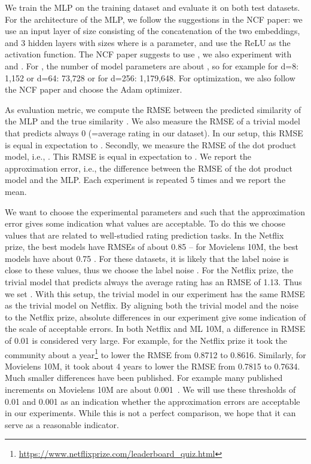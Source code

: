 \documentclass{article}
\begin{document}
We train the MLP on the training dataset and evaluate it on both test datasets. For the architecture of the MLP, we follow the suggestions in the NCF paper: we use an input layer of size  consisting of the concatenation of the two embeddings, and 3 hidden layers with sizes  where  is a parameter, and use the ReLU as the activation function.
The NCF paper suggests to use , we also experiment with  and .
For , the number of model parameters are about , so for example for d=8: 1,152 or d=64: 73,728 or for d=256: 1,179,648.
For optimization, we also follow the NCF paper and choose the Adam optimizer.

As evaluation metric, we compute the RMSE between the predicted similarity of the MLP and the true similarity .
We also measure the RMSE of a trivial model that predicts always 0 (=average rating in our dataset).
In our setup, this RMSE is equal in expectation to .
Secondly, we measure the RMSE of the dot product model, i.e., .
This RMSE is equal in expectation to .
We report the approximation error, i.e., the difference between the RMSE of the dot product model and the MLP.
Each experiment is repeated 5 times and we report the mean.

We want to choose the experimental parameters  and  such that the approximation error gives some indication what values are acceptable.
To do this we choose values that are related to well-studied rating prediction tasks.
In the Netflix prize, the best models have RMSEs of about 0.85 \cite{koren:grandprize} -- for Movielens 10M, the best models have about 0.75 \cite{rendle:arxiv19}.
For these datasets, it is likely that the label noise is close to these values, thus we choose the label noise .
For the Netflix prize, the trivial model that predicts always the average rating has an RMSE of 1.13.
Thus we set .
With this setup, the trivial model in our experiment has the same RMSE as the trivial model on Netflix.
By aligning both the trivial model and the noise to the Netflix prize, absolute differences in our experiment give some indication of the scale of acceptable errors.
In both Netflix and ML 10M, a difference in RMSE of 0.01 is considered very large.
For example, for the Netflix prize it took the community about a year\footnote{\url{https://www.netflixprize.com/leaderboard_quiz.html}} to lower the RMSE from 0.8712 to 0.8616.
Similarly, for Movielens 10M, it took about 4 years  to lower the RMSE from 0.7815 to 0.7634.
Much smaller differences have been published. For example many published increments on Movielens 10M are about 0.001~\cite{rendle:arxiv19}.
We will use these thresholds of 0.01 and 0.001 as an indication whether the approximation errors are acceptable in our experiments.
While this is not a perfect comparison, we hope that it can serve as a reasonable indicator.
\end{document}
